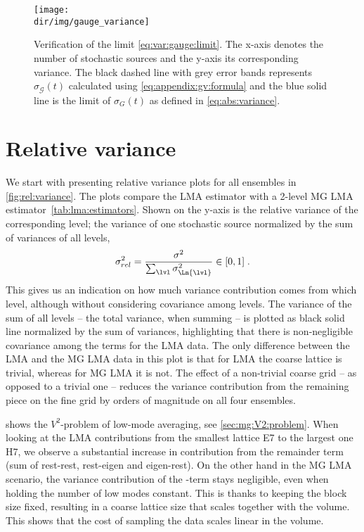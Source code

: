 \begin{figure}
\centering
\texttt{[image: \\dir/img/gauge\_variance]}
\caption{
Verification of the limit \cref{eq:var:gauge:limit}.
The x-axis denotes the number of stochastic sources and the y-axis its corresponding variance.
The black dashed line with grey error bands represents $\sigma_{\mathcal{G}}(t)$ calculated using \cref{eq:appendix:gv:formula} and the blue solid line is the limit of $\sigma_{G}(t)$ as defined in \cref{eq:abs:variance}.
\takenfull
}
\label{fig:gauge:variance}
\end{figure}

\section{Relative variance}

We start with presenting relative variance plots for all ensembles in \cref{fig:rel:variance}.
The plots compare the LMA estimator with a 2-level MG LMA estimator~\cref{tab:lma:estimators}.
Shown on the y-axis is the relative variance of the corresponding level; the variance of one stochastic source normalized by the sum of variances of all levels, \ie
\begin{equation} \label{eq:rel:variance}
\sigma_{rel}^{2} = \frac{\sigma^{2}}{ \sum_{\lvl} \sigma_{\Ln{\lvl}}^{2} } \in [0, 1] \;.
\end{equation}
This gives us an indication on how much variance contribution comes from which level, although without considering covariance among levels.
The variance of the sum of all levels -- the total variance, when summing -- is plotted as black solid line normalized by the sum of variances, highlighting that there is non-negligible covariance among the terms for the LMA data.
The only difference between the LMA and the MG LMA data in this plot is that for LMA the  coarse lattice is trivial, whereas for MG LMA it is not.
The effect of a non-trivial coarse grid -- as opposed to a trivial one -- reduces the variance contribution from the remaining piece on the fine grid by orders of magnitude on all four ensembles.

 shows the $V^{2}$-problem of low-mode averaging, see \cref{sec:mg:V2:problem}.
When looking at the LMA contributions from the smallest lattice E7 to the largest one H7, we observe a substantial increase in contribution from the remainder term (sum of rest-rest, rest-eigen and eigen-rest).
On the other hand in the MG LMA scenario, the variance contribution of the -term stays negligible, even when holding the number of low modes constant.
This is thanks to keeping the block size fixed, resulting in a coarse lattice size that scales together with the volume.
This shows that the cost of sampling the data scales linear in the volume.


